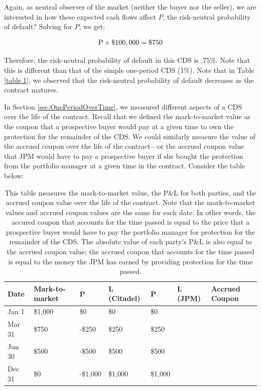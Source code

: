 \documentclass{jss}
\begin{document}
Again, as neutral observer of the market (neither the buyer nor the seller), we are interested in how these expected cash flows affect $P$, the risk-neutral probability of default? Solving for $P$, we get:

\begin{equation}
 \begin{aligned}
   {\rm P \times \$100,000 = \$750}
    \end{aligned}
\end{equation}

Therefore, the risk-neutral probability of default in this CDS is .75\%. Note that this is different than that of the simple one-period CDS (1\%). Note that in Table \ref{table.1}, we observed that the risk-neutral probability of default decreases as the contract matures. 

In Section \ref{sec:OnePeriodOverTime}, we measured different aspects of a CDS over the life of the contract. Recall that we defined the mark-to-market value as the coupon that a prospective buyer would pay at a given time to own the protection for the remainder of the CDS. We could similarly measure the value of the accrued coupon over the life of the contract---or the accrued coupon value that JPM would have to pay a prospective buyer if she bought the protection from the portfolio manager at a given time in the contract. Consider the table below:

\begin{table}[H]
\centering
{\footnotesize
\begin{tabular}{lllll}
  \hline
Date & Mark-to-market & P&L (Citadel) & P&L (JPM) & Accrued Coupon \\ 
  \hline
  Jan 1 & \$1,000 & \$0 & \$0 & \$0\\ 
  Mar 31 & \$750 & -\$250 & \$250 & \$250\\ 
  Jun 30 & \$500 & -\$500 & \$500 & \$500\\ 
  Dec 31 & \$0 & -\$1,000 & \$1,000 & \$1,000\\
   \hline
\end{tabular}
}
\caption{This table measures the mark-to-market value, the P&L for both parties, and the accrued coupon value over the life of the contract. Note that the mark-to-market values and accrued coupon values are the same for each date. In other words, the accured coupon that accounts for the time passed is equal to the price that a prospective buyer would have to pay the portfolio manager for protection for the remainder of the CDS. The absolute value of each party's P&L is also equal to the accrued coupon value; the accrued coupon that accounts for the time passed is equal to the money the JPM has earned by providing protection for the time passed.}
\end{table}
\end{document}
